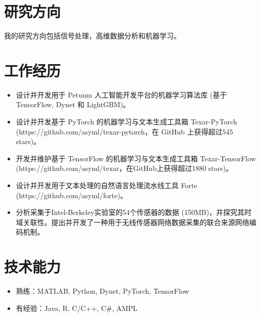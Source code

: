 \documentclass{resume}
\begin{document}


\section{研究方向}
我的研究方向包括信号处理，高维数据分析和机器学习。

\section{工作经历}
\begin{itemize}
\item 设计并开发用于 Petuum 人工智能开发平台的机器学习算法库 (基于 TensorFlow, Dynet 和 LightGBM)。
\item 设计并开发基于 PyTorch 的机器学习与文本生成工具箱 Texar-PyTorch (https://github.com/asyml/texar-pytorch，在 GitHub 上获得超过545 stars)。
\item 开发并维护基于 TensorFlow 的机器学习与文本生成工具箱 Texar-TensorFlow (https://github.com/asyml/texar，在GitHub上获得超过1880 stars)。
\item 设计并开发用于文本处理的自然语言处理流水线工具 Forte (https://github.com/asyml/forte)。
\end{itemize}

\begin{itemize}
\item 分析采集于Intel-Berkeley实验室的54个传感器的数据 (150MB)，并探究其时域关联性。提出并开发了一种用于无线传感器网络数据采集的联合来源网络编码机制。
\end{itemize}


\section{技术能力}
\begin{itemize}[parsep=0.2ex]
\item 熟练：MATLAB, Python, Dynet, PyTorch, TensorFlow
\item 有经验：Java, R, C/C++, C\#, AMPL
\end{itemize}
\end{document}
